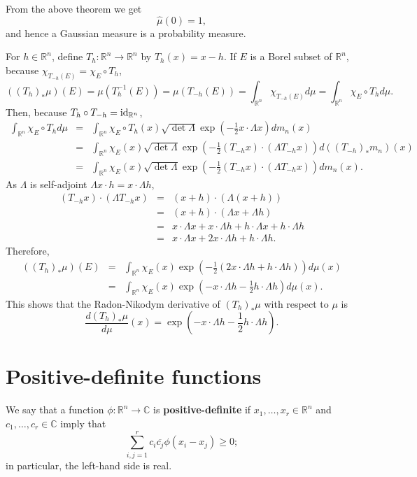 \documentclass{article}
\newcommand{\id}{\ensuremath\mathrm{id}}
\theoremstyle{definition}
\theoremstyle{definition}
\begin{document}
From the above theorem we get 
\[
\hat{\mu}(0)=1,
\]
and hence a Gaussian measure is a probability measure.

For $h \in \mathbb{R}^n$, define $T_h:\mathbb{R}^n \to \mathbb{R}^n$ by $T_h(x)=x-h$. 
If $E$ is a Borel subset of $\mathbb{R}^n$, because $\chi_{T_{-h}(E)}=\chi_E \circ T_h$,
\[
((T_h)_* \mu) (E)=\mu(T_h^{-1}(E))=\mu(T_{-h}(E))=\int_{\mathbb{R}^n} \chi_{T_{-h}(E)} d\mu=
\int_{\mathbb{R}^n} \chi_E \circ T_h d\mu.
\]
Then, because $T_h \circ T_{-h} = \id_{\mathbb{R}^n}$, 
\begin{eqnarray*}
\int_{\mathbb{R}^n} \chi_E \circ T_h d\mu&=&\int_{\mathbb{R}^n}\chi_E \circ T_h (x)  \sqrt{\det \Lambda} \exp\left(-\frac{1}{2} x\cdot \Lambda x \right) dm_n(x)\\
&=&\int_{\mathbb{R}^n}\chi_E(x)  \sqrt{\det \Lambda} \exp\left(-\frac{1}{2} (T_{-h}x)\cdot (\Lambda T_{-h}x) \right) d((T_{-h})_*m_n)(x)\\
&=&\int_{\mathbb{R}^n}\chi_E(x)  \sqrt{\det \Lambda} \exp\left(-\frac{1}{2} (T_{-h}x)\cdot (\Lambda T_{-h}x) \right) dm_n(x).
\end{eqnarray*}
As $\Lambda$ is self-adjoint $\Lambda x\cdot  h =  x \cdot \Lambda h$,
\begin{eqnarray*}
(T_{-h}x)\cdot (\Lambda T_{-h}x)&=&(x+h)\cdot (\Lambda(x+h))\\
&=&(x+h)\cdot (\Lambda x + \Lambda h)\\
&=&x\cdot \Lambda x + x\cdot \Lambda h + h \cdot \Lambda x + h \cdot \Lambda h\\
&=&x\cdot \Lambda x + 2x\cdot \Lambda h + h \cdot \Lambda h.
\end{eqnarray*}
Therefore,
\begin{eqnarray*}
((T_h)_* \mu) (E) &=& \int_{\mathbb{R}^n} \chi_E(x) \exp\left(-\frac{1}{2}\left(2x\cdot \Lambda h + h \cdot \Lambda h\right)\right) d\mu(x)\\
&=&\int_{\mathbb{R}^n} \chi_E(x) \exp\left(-x\cdot \Lambda h -\frac{1}{2}h \cdot \Lambda h\right) d\mu(x).
\end{eqnarray*}
This shows that the Radon-Nikodym derivative of $(T_h)_*\mu$ with respect to $\mu$ is 
\[
\frac{d(T_h)_*\mu}{d\mu}(x) = \exp\left(-x\cdot \Lambda h -\frac{1}{2}h \cdot \Lambda h\right).
\]


\section{Positive-definite functions}
We say that a function $\phi:\mathbb{R}^n \to \mathbb{C}$ is \textbf{positive-definite}
if $x_1,\ldots,x_r \in \mathbb{R}^n$ and $c_1,\ldots,c_r \in
\mathbb{C}$ imply
that
\[
\sum_{i,j=1}^r c_i \overline{c_j} \phi(x_i-x_j) \geq 0;
\]
in particular, the left-hand side is real.
\end{document}
